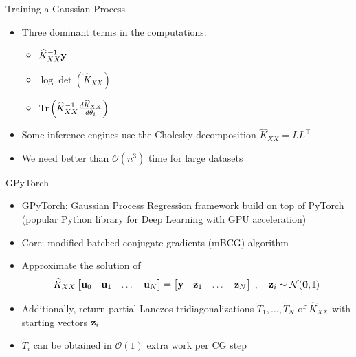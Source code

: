 \documentclass{beamer}
\begin{document}
\begin{frame}{Training a Gaussian Process}
\begin{itemize}[<+->]
    \item Three dominant terms in the computations:
    \begin{itemize}
        \item $\widehat K_{XX}^{-1} \boldsymbol{\mathbf{y}}$
        \item $\log \det \left( \widehat K_{XX} \right)$
        \item $\operatorname{Tr} \left( \widehat K_{XX}^{-1} \frac{d \widehat K_{XX}}{d\theta_i} \right)$
    \end{itemize}
    \item Some inference engines use the Cholesky decomposition $\widehat K_{XX} = L L^\top$
    \item We need better than $\mathcal O(n^3)$ time for large datasets
\end{itemize}
\end{frame}

\begin{frame}{GPyTorch}
\begin{itemize}[<+->]
    \item GPyTorch: Gaussian Process Regression framework build on top of PyTorch (popular Python library for Deep Learning with GPU acceleration)
    \item Core: modified batched conjugate gradients (mBCG) algorithm
    \item Approximate the solution of 
    \begin{equation*}
    \widehat K_{XX} \begin{bmatrix} \vect u_0 & \vect u_1 & \dots & \vect u_N \end{bmatrix} = 
    \begin{bmatrix} \vect y & \vect z_1 & \dots & \vect z_N \end{bmatrix} \; ,
    \quad \vect z_i \sim \mathcal N(\vect 0, \Id)
    \end{equation*}
    \item Additionally, return partial Lanczos tridiagonalizations $\tilde T_1, \ldots, \tilde T_N$ of $\widehat K_{XX}$ with starting vectors $\boldsymbol{\mathbf{z}}_i$
    \item $\tilde T_i$ can be obtained in $\mathcal O(1)$ extra work per CG step
\end{itemize}
\end{frame}
\end{document}

